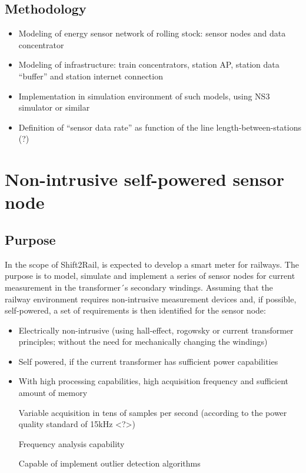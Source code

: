 \subsection{Methodology}


\begin{itemize}
	\setlength\itemsep{0em}

	\item Modeling of energy sensor network of rolling stock: sensor nodes and data concentrator

	\item Modeling of infrastructure: train concentrators, station AP, station data “buffer” and station internet connection

	\item Implementation in simulation environment of such models, using NS3 simulator or similar

	\item Definition of “sensor data rate” as function of the line length-between-stations (?)
	
\end{itemize}





\newpage
\section{Non-intrusive self-powered sensor node}

\subsection{Purpose}
In the scope of Shift2Rail, is expected to develop a smart meter for railways. The purpose is to model, simulate and implement a series of sensor nodes for current measurement in the transformer´s secondary windings. Assuming that the railway environment requires non-intrusive measurement devices and, if possible, self-powered, a set of requirements is then identified for the sensor node:

\begin{itemize}
	\setlength\itemsep{0em}
	\item Electrically non-intrusive (using hall-effect, rogowsky or current transformer principles; without the need for mechanically changing the windings)

	\item Self powered, if the current transformer has sufficient power capabilities

	\item With high processing capabilities, high acquisition frequency and sufficient amount of memory 

	\subitem Variable acquisition in tens of samples per second (according to the power quality standard of 15kHz <?>)

	\subitem Frequency analysis capability

	\subitem Capable of implement outlier detection algorithms 
\end{itemize}

